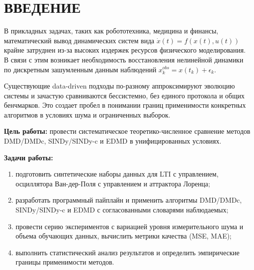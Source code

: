 \chapter*{ВВЕДЕНИЕ}
\label{ch:intro}

В прикладных задачах, таких как робототехника, медицина и финансы, математический вывод динамических систем вида $\dot{x}(t)=f(x(t),u(t))$ крайне затруднен из-за высоких издержек ресурсов физического моделирования. В связи с этим возникает необходимость восстановления нелинейной динамики по дискретным зашумленным данным наблюдений $x_{k}^{obs}=x(t_{k})+\epsilon_{k}$. 

Существующие data-driven подходы по-разному аппроксимируют эволюцию системы и зачастую сравниваются бессистемно, без единого протокола и общих бенчмарков. Это создает пробел в понимании границ применимости конкретных алгоритмов в условиях шума и ограниченных выборок.

\textbf{Цель работы:} провести систематическое теоретико-численное сравнение методов DMD/DMDc, SINDy/SINDy-c и EDMD в унифицированных условиях.

\textbf{Задачи работы:}
\begin{enumerate}
    \item подготовить синтетические наборы данных для LTI с управлением, осциллятора Ван-дер-Поля с управлением и аттрактора Лоренца;
    \item разработать программный пайплайн и применить алгоритмы DMD/DMDc, SINDy/SINDy-c и EDMD с согласованными словарями наблюдаемых;
    \item провести серию экспериментов с вариацией уровня измерительного шума и объема обучающих данных, вычислить метрики качества (MSE, MAE);
    \item выполнить статистический анализ результатов и определить эмпирические границы применимости методов.
\end{enumerate}